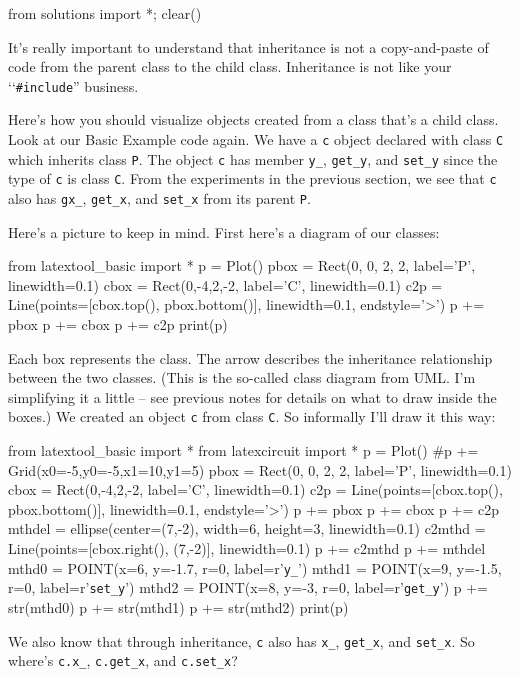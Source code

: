 \begin{python0}
from solutions import *; clear()
\end{python0}

It's really important to understand that inheritance is not a copy-and-paste of code from the parent class to the child class. Inheritance is not like your \lq\lq \verb!#include!'' business.

Here's how you should visualize objects created from a class that's a child class. Look at our Basic Example code again. We have a \verb!c! object declared with class \verb!C! which inherits class \verb!P!. The object \verb!c! has member \verb!y_!, \verb!get_y!, and \verb!set_y! since the type of \verb!c! is class \verb!C!. From the experiments in the previous section, we see that \verb!c! also has \verb!gx_!, \verb!get_x!, and \verb!set_x! from its parent \verb!P!.

Here's a picture to keep in mind. First here's a diagram of our classes:
\begin{python}
from latextool_basic import *
p = Plot()
pbox = Rect(0, 0, 2, 2, label='P', linewidth=0.1)
cbox = Rect(0,-4,2,-2, label='C', linewidth=0.1)
c2p = Line(points=[cbox.top(), pbox.bottom()], linewidth=0.1, endstyle='>')
p += pbox
p += cbox
p += c2p
print(p)
\end{python}
Each box represents the class. The arrow describes the inheritance
relationship between the two classes. (This is the so-called class
diagram from UML. I'm simplifying it a little -- see previous notes for
details on what to draw inside the boxes.) We created an object \verb!c!
from class \verb!C!. So informally I'll draw it this way:
\begin{python}
from latextool_basic import *
from latexcircuit import *
p = Plot()
#p += Grid(x0=-5,y0=-5,x1=10,y1=5)
pbox = Rect(0, 0, 2, 2, label='P', linewidth=0.1)
cbox = Rect(0,-4,2,-2, label='C', linewidth=0.1)
c2p = Line(points=[cbox.top(), pbox.bottom()], linewidth=0.1, endstyle='>')
p += pbox
p += cbox
p += c2p
mthdel = ellipse(center=(7,-2), width=6, height=3, linewidth=0.1)
c2mthd = Line(points=[cbox.right(), (7,-2)], linewidth=0.1)
p += c2mthd
p += mthdel
mthd0 = POINT(x=6, y=-1.7, r=0, label=r'\verb!y_!')
mthd1 = POINT(x=9, y=-1.5, r=0, label=r'\verb!set_y!')
mthd2 = POINT(x=8, y=-3, r=0, label=r'\verb!get_y!')
p += str(mthd0)
p += str(mthd1)
p += str(mthd2)
print(p)
\end{python}
We also know that through inheritance, \verb!c! also has \verb!x_!,
\verb!get_x!, and \verb!set_x!. So where's \verb!c.x_!,
\verb!c.get_x!, and \verb!c.set_x!?


